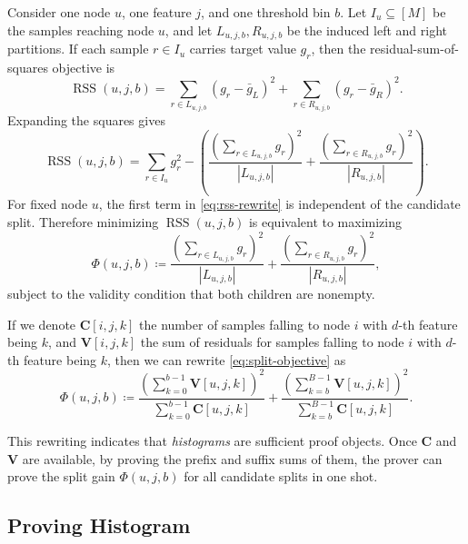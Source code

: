Consider one node $u$, one feature $j$, and one threshold bin $b$. Let
$I_u \subseteq [M]$ be the samples reaching node $u$, and let
$L_{u,j,b},R_{u,j,b}$ be the induced left and right partitions. If each sample
$r\in I_u$ carries target value $g_r$, then the residual-sum-of-squares
objective is
\[
\operatorname{RSS}(u,j,b)
=
\sum_{r\in L_{u,j,b}}(g_r-\bar{g}_L)^2
+
\sum_{r\in R_{u,j,b}}(g_r-\bar{g}_R)^2.
\]
Expanding the squares gives
\begin{equation}\label{eq:rss-rewrite}
\operatorname{RSS}(u,j,b)
=
\sum_{r\in I_u} g_r^2
-
\left(
\frac{\left(\sum_{r\in L_{u,j,b}} g_r\right)^2}{|L_{u,j,b}|}
+
\frac{\left(\sum_{r\in R_{u,j,b}} g_r\right)^2}{|R_{u,j,b}|}
\right).
\end{equation}
For fixed node $u$, the first term in \eqref{eq:rss-rewrite} is independent of
the candidate split. Therefore minimizing $\operatorname{RSS}(u,j,b)$ is
equivalent to maximizing
\begin{equation}\label{eq:split-objective}
\Phi(u,j,b)
\coloneqq
\frac{\left(\sum_{r\in L_{u,j,b}} g_r\right)^2}{|L_{u,j,b}|}
+
\frac{\left(\sum_{r\in R_{u,j,b}} g_r\right)^2}{|R_{u,j,b}|},
\end{equation}
subject to the validity condition that both children are nonempty.

If we denote $\mathbf{C}[i, j, k]$ the number of samples falling to node $i$ with $d$-th feature being $k$,
  and $\mathbf{V}[i, j, k]$ the sum of residuals for samples falling to node $i$ with $d$-th feature being $k$,
  then we can rewrite \eqref{eq:split-objective} as
\begin{equation}
\Phi(u,j,b)
\coloneqq
\frac{\left(\sum_{k=0}^{b-1} \mathbf{V}[u, j, k]\right)^2}{\sum_{k=0}^{b-1} \mathbf{C}[u, j, k]}
+
\frac{\left(\sum_{k=b}^{B-1} \mathbf{V}[u, j, k]\right)^2}{\sum_{k=b}^{B-1} \mathbf{C}[u, j, k]}.
\end{equation}

This rewriting indicates that \emph{histograms} are sufficient proof objects. 
Once $\mathbf{C}$ and $\mathbf{V}$ are available, by proving the prefix and suffix sums of them,
the prover can prove the split gain $\Phi(u,j,b)$ for all candidate splits in one shot.

\subsection{Proving Histogram}

